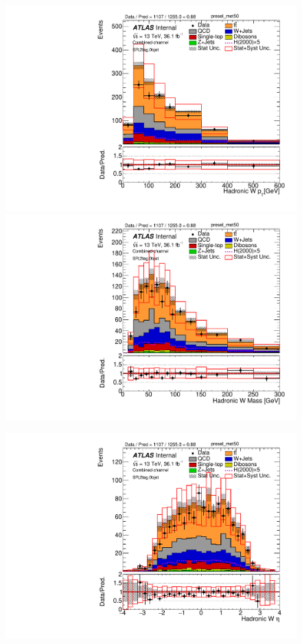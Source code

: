 \begin{figure}[!h]
\begin{center}
\includegraphics[scale=0.33]{./figures/boosted/PlotsInMbbSR/Unblinded/DataMC_2tag_0bjet_SR_lepton_presel_met50_WhadPt}
\includegraphics[scale=0.33]{./figures/boosted/PlotsInMbbSR/Unblinded/DataMC_2tag_0bjet_SR_lepton_presel_met50_WhadMass} \\
\par\medskip
\includegraphics[scale=0.33]{./figures/boosted/PlotsInMbbSR/Unblinded/DataMC_2tag_0bjet_SR_lepton_presel_met50_WhadEta}

\end{center}
\end{figure}
